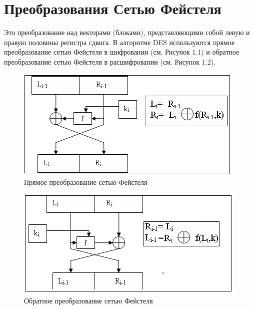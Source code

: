 \section{Преобразования Сетью Фейстеля}
Это преобразование над векторами (блоками), представляющими собой левую и правую половины регистра сдвига. В алгоритме DES используются прямое преобразование сетью Фейстеля в шифровании (см. Рисунок 1.1) и обратное преобразование сетью Фейстеля в расшифровании (см. Рисунок 1.2).
\begin{figure}[H]
\centering
\includegraphics[scale=1.5]{pict/netF1.png}
\caption{Прямое преобразование сетью Фейстеля}
\end{figure}

\begin{figure}[H]
\centering
\includegraphics[scale=1.5]{pict/netF2.png}
\caption{Обратное преобразование сетью Фейстеля}
\end{figure}

